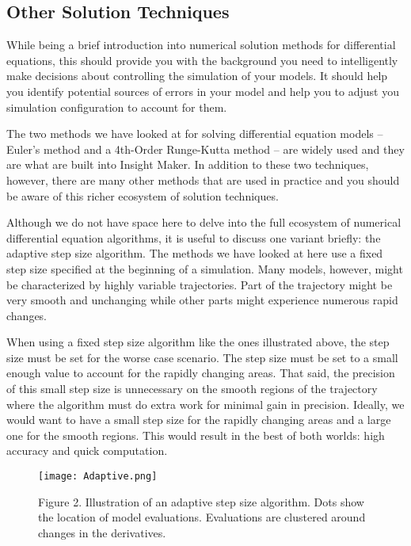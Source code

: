 \documentclass[]{memoir}
\let\Oldincludegraphics\includegraphics
\renewcommand{\includegraphics}[1]{\Oldincludegraphics[max size={\textwidth}{\textheight}]{#1}}
\begin{document}
\subsection{Other Solution Techniques}

While being a brief introduction into numerical solution methods for
differential equations, this should provide you with the background you
need to intelligently make decisions about controlling the simulation of
your models. It should help you identify potential sources of errors in
your model and help you to adjust you simulation configuration to
account for them.

The two methods we have looked at for solving differential equation
models -- Euler's method and a 4th-Order Runge-Kutta method -- are
widely used and they are what are built into Insight Maker. In addition
to these two techniques, however, there are many other methods that are
used in practice and you should be aware of this richer ecosystem of
solution techniques.

Although we do not have space here to delve into the full ecosystem of
numerical differential equation algorithms, it is useful to discuss one
variant briefly: the adaptive step size algorithm. The methods we have
looked at here use a fixed step size specified at the beginning of a
simulation. Many models, however, might be characterized by highly
variable trajectories. Part of the trajectory might be very smooth and
unchanging while other parts might experience numerous rapid changes.

When using a fixed step size algorithm like the ones illustrated above,
the step size must be set for the worse case scenario. The step size
must be set to a small enough value to account for the rapidly changing
areas. That said, the precision of this small step size is unnecessary
on the smooth regions of the trajectory where the algorithm must do
extra work for minimal gain in precision. Ideally, we would want to have
a small step size for the rapidly changing areas and a large one for the
smooth regions. This would result in the best of both worlds: high
accuracy and quick computation.

\begin{figure}[htbp]
\centering
\texttt{[image: Adaptive.png]}
\caption{Figure 2. Illustration of an adaptive step size algorithm. Dots
show the location of model evaluations. Evaluations are clustered around
changes in the derivatives.}
\end{figure}
\end{document}
